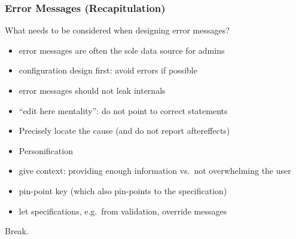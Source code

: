 \begin{frame}
	\frametitle{Error Messages (Recapitulation)}

	\begin{task}
	What needs to be considered when designing error messages?
	\end{task}

	\pause

	\begin{itemize} %
	\item error messages are often the sole data source for admins
	\item configuration design first: avoid errors if possible
	\item error messages should not leak internals~\cite{brown1983error}
	\item ``edit here mentality'': do not point to correct statements~\cite{marceau2011mind}
	\item Precisely locate the cause (and do not report aftereffects)
	\item Personification~\cite{lee2011personifying}
	\item give context: providing enough information vs.\ not overwhelming the user~\cite{wrenn2017error}

	\item pin-point key (which also pin-points to the specification)
	\item let specifications, e.g.\ from validation, override messages
	\end{itemize}
\end{frame}



\begin{assignment}
	\begin{task}
	Break.
	\end{task}
\end{assignment}



